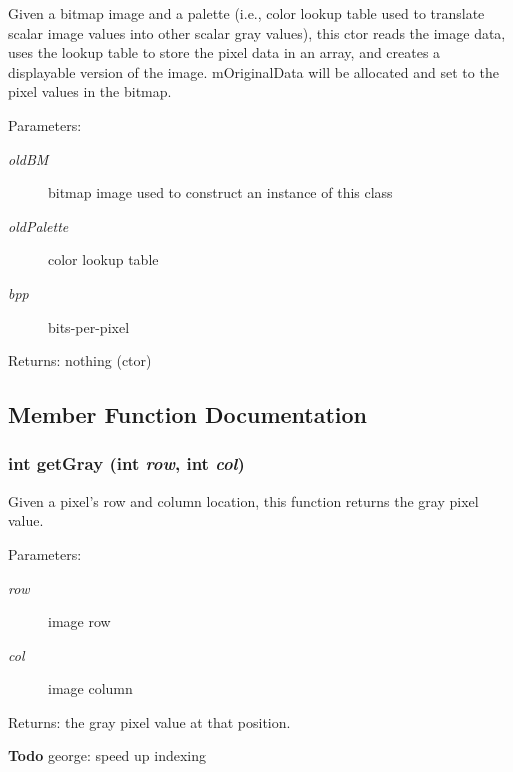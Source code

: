 Given a bitmap image and a palette (i.e., color lookup table used to translate scalar image values into other scalar gray values), this ctor reads the image data, uses the lookup table to store the pixel data in an array, and creates a displayable version of the image. m\-Original\-Data will be allocated and set to the pixel values in the bitmap. 

\begin{Desc}
\item[Parameters:]
\begin{description}
\item[{\em old\-BM}]bitmap image used to construct an instance of this class \item[{\em old\-Palette}]color lookup table \item[{\em bpp}]bits-per-pixel \end{description}
\end{Desc}
\begin{Desc}
\item[Returns:]nothing (ctor) \end{Desc}


\subsection{Member Function Documentation}
\subsubsection{\setlength{\rightskip}{0pt plus 5cm}int get\-Gray (int {\em row}, int {\em col})}\label{class_c_s_image_viewer_1_1_gray_image_data_dcb7178c700e5ead72cd80cf91d05c2e}


Given a pixel's row and column location, this function returns the gray pixel value. 

\begin{Desc}
\item[Parameters:]
\begin{description}
\item[{\em row}]image row \item[{\em col}]image column \end{description}
\end{Desc}
\begin{Desc}
\item[Returns:]the gray pixel value at that position.\end{Desc}
\begin{Desc}
\item[{\bf Todo}]george: speed up indexing \end{Desc}
